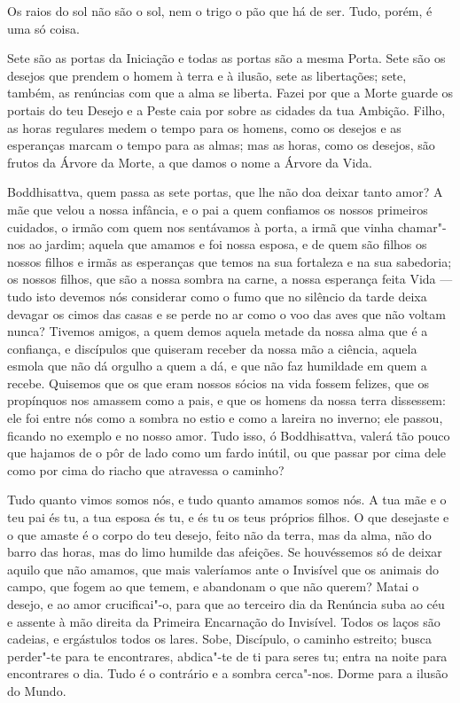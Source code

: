  Os raios do sol não são o sol, nem o trigo o pão que há de
ser. Tudo, porém, é uma só coisa.

Sete são as portas da Iniciação e todas as portas são a mesma Porta.
Sete são os desejos que prendem o homem à terra e à ilusão, sete as
libertações; sete, também, as renúncias com que a alma se liberta.
Fazei por que a Morte guarde os portais do teu Desejo e a Peste caia
por sobre as cidades da tua Ambição. Filho, as horas regulares medem
o tempo para os homens, como os desejos e as esperanças marcam o
tempo para as almas; mas as horas, como os desejos, são frutos da
Árvore da Morte, a que damos o nome a Árvore da Vida.

Boddhisattva, quem passa as sete portas, que lhe não doa deixar tanto
amor? A mãe que velou a nossa infância, e o pai a quem confiamos os
nossos primeiros cuidados, o irmão com quem nos sentávamos à porta, a
irmã que vinha chamar"-nos ao jardim; aquela que amamos e foi nossa
esposa, e de quem são filhos os nossos filhos e irmãs as esperanças
que temos na sua fortaleza e na sua sabedoria; os nossos filhos, que
são a nossa sombra na carne, a nossa esperança feita Vida --- tudo isto
devemos nós considerar como o fumo que no silêncio da tarde deixa
devagar os cimos das casas e se perde no ar como o voo das aves que
não voltam nunca? Tivemos amigos, a quem demos aquela metade da nossa
alma que é a confiança, e discípulos que quiseram receber da nossa
mão a ciência, aquela esmola que não dá orgulho a quem a dá, e que
não faz humildade em quem a recebe. Quisemos que os que eram nossos
sócios na vida fossem felizes, que os propínquos nos amassem como a
pais, e que os homens da nossa terra dissessem: ele foi entre nós
como a sombra no estio e como a lareira no inverno; ele passou,
ficando no exemplo e no nosso amor. Tudo isso, ó Boddhisattva, valerá
tão pouco que hajamos de o pôr de lado como um fardo inútil, ou que
passar por cima dele como por cima do riacho que atravessa o caminho?

Tudo quanto vimos somos nós, e tudo quanto amamos somos nós. A tua mãe
e o teu pai és tu, a tua esposa és tu, e és tu os teus próprios
filhos. O que desejaste e o que amaste é o corpo do teu desejo, feito
não da terra, mas da alma, não do barro das horas, mas do limo
humilde das afeições. Se houvéssemos só de deixar aquilo que não
amamos, que mais valeríamos ante o Invisível que os animais do campo,
que fogem ao que temem, e abandonam o que não querem? Matai o desejo,
e ao amor crucificai"-o, para que ao terceiro dia da Renúncia suba ao
céu e assente à mão direita da Primeira Encarnação do Invisível.
Todos os laços são cadeias, e ergástulos todos os lares. Sobe,
Discípulo, o caminho estreito; busca perder"-te para te encontrares,
abdica"-te de ti para seres tu; entra na noite para encontrares o dia.
Tudo é o contrário e a sombra cerca"-nos. Dorme para a ilusão do
Mundo.

